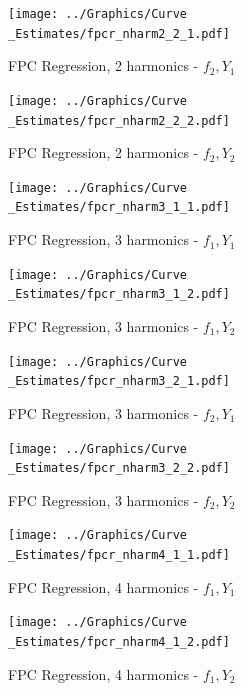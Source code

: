 \documentclass[11pt,twoside,a4paper]{article}
\begin{document}
	\begin{figure}[H]
		\centering
		\begin{minipage}{.5\textwidth}
			\centering
			\texttt{[image: ../Graphics/Curve\\\_Estimates/fpcr\_nharm2\_2\_1.pdf]}
			\caption{FPC Regression, 2 harmonics - $f_2, Y_1$}
		\end{minipage}%
		\begin{minipage}{.5\textwidth}
			\centering
			\texttt{[image: ../Graphics/Curve\\\_Estimates/fpcr\_nharm2\_2\_2.pdf]}
			\caption{FPC Regression, 2 harmonics - $f_2, Y_2$}
		\end{minipage}
	\end{figure}

		\begin{figure}[H]
		\centering
		\begin{minipage}{.5\textwidth}
			\centering
			\texttt{[image: ../Graphics/Curve\\\_Estimates/fpcr\_nharm3\_1\_1.pdf]}
			\caption{FPC Regression, 3 harmonics - $f_1, Y_1$}
		\end{minipage}%
		\begin{minipage}{.5\textwidth}
			\centering
			\texttt{[image: ../Graphics/Curve\\\_Estimates/fpcr\_nharm3\_1\_2.pdf]}
			\caption{FPC Regression, 3 harmonics - $f_1, Y_2$}
		\end{minipage}
	\end{figure}
	
	\begin{figure}[H]
		\centering
		\begin{minipage}{.5\textwidth}
			\centering
			\texttt{[image: ../Graphics/Curve\\\_Estimates/fpcr\_nharm3\_2\_1.pdf]}
			\caption{FPC Regression, 3 harmonics - $f_2, Y_1$}
		\end{minipage}%
		\begin{minipage}{.5\textwidth}
			\centering
			\texttt{[image: ../Graphics/Curve\\\_Estimates/fpcr\_nharm3\_2\_2.pdf]}
			\caption{FPC Regression, 3 harmonics - $f_2, Y_2$}
		\end{minipage}
	\end{figure}

		\begin{figure}[H]
		\centering
		\begin{minipage}{.5\textwidth}
			\centering
			\texttt{[image: ../Graphics/Curve\\\_Estimates/fpcr\_nharm4\_1\_1.pdf]}
			\caption{FPC Regression, 4 harmonics - $f_1, Y_1$}
		\end{minipage}%
		\begin{minipage}{.5\textwidth}
			\centering
			\texttt{[image: ../Graphics/Curve\\\_Estimates/fpcr\_nharm4\_1\_2.pdf]}
			\caption{FPC Regression, 4 harmonics - $f_1, Y_2$}
		\end{minipage}
	\end{figure}
	
\end{document}
